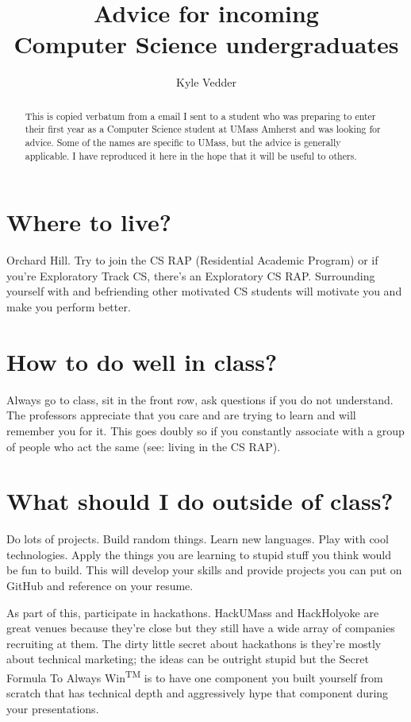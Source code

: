 \documentclass{article}
\begin{document}
\title{Advice for incoming\\Computer Science undergraduates}
\author{Kyle Vedder}

\maketitle

\begin{abstract}
This is copied verbatum from a email I sent to a student who was preparing to enter their first year as a Computer Science student at UMass Amherst and was looking for advice. Some of the names are specific to UMass, but the advice is generally applicable. I have reproduced it here in the hope that it will be useful to others.
\end{abstract}

\section{Where to live?}
Orchard Hill. Try to join the CS RAP (Residential Academic Program) or if you're Exploratory Track CS, there's an Exploratory CS RAP. Surrounding yourself with and befriending other motivated CS students will motivate you and make you perform better.

\section{How to do well in class?}
Always go to class, sit in the front row, ask questions if you do not understand. The professors appreciate that you care and are trying to learn and will remember you for it. This goes doubly so if you constantly associate with a group of people who act the same (see: living in the CS RAP).

\section{What should I do outside of class?}
Do lots of projects. Build random things. Learn new languages. Play with cool technologies. Apply the things you are learning to stupid stuff you think would be fun to build. This will develop your skills and provide projects you can put on GitHub and reference on your resume.

As part of this, participate in hackathons. HackUMass and HackHolyoke are great venues because they're close but they still have a wide array of companies recruiting at them. The dirty little secret about hackathons is they're mostly about technical marketing; the ideas can be outright stupid but the Secret Formula To Always Win\textsuperscript{TM} is to have one component you built yourself from scratch that has technical depth and aggressively hype that component during your presentations.
\end{document}
